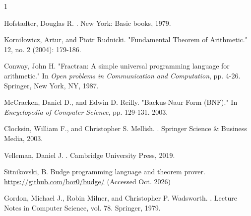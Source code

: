 \documentclass{article}
\begin{document}
\begin{footnotesize}
\begin{thebibliography}{1}
\setlength{\itemsep}{0pt}

Hofstadter, Douglas R.
.
\newblock New York: Basic books, 1979.

Korniłowicz, Artur, and Piotr Rudnicki.
\newblock "Fundamental Theorem of Arithmetic."
 12, no. 2 (2004): 179-186.

Conway, John H.
\newblock "Fractran: A simple universal programming language for arithmetic."
\newblock In {\em Open problems in Communication and Computation}, pp. 4-26. Springer, New York, NY, 1987.

McCracken, Daniel D., and Edwin D. Reilly.
\newblock "Backus-Naur Form (BNF)."
\newblock In {\em Encyclopedia of Computer Science}, pp. 129-131. 2003.

Clocksin, William F., and Christopher S. Mellish.
.
\newblock Springer Science \& Business Media, 2003.

Velleman, Daniel J.
.
\newblock Cambridge University Press, 2019.

Sitnikovski, B.
\newblock Budge programming language and theorem prover.
\newblock \url{https://github.com/bor0/budge/} (Accessed Oct. 2026)

Gordon, Michael J., Robin Milner, and Christopher P. Wadsworth.
.
\newblock Lecture Notes in Computer Science, vol. 78. Springer, 1979.

\end{thebibliography}
\end{footnotesize}
\end{document}
